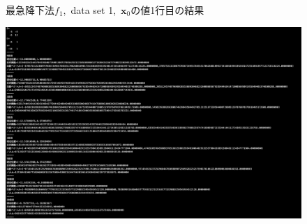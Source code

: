 \documentclass[12pt]{jarticle}
\begin{document}
\begin{figure}[h]
\begin{center}
    \end{center}
    \caption{最急降下法$f_1$,\ data set 1,\ $\boldsymbol{x}_0$の値1行目の結果}
\end{figure}

\clearpage
\begin{figure}[h]
    \begin{center}
        \includegraphics[scale=0.2]{kadai1_1s_out1_2_1.png}
    \end{center}
    \begin{minipage}{0.5\hsize}
        \begin{center}

\end{center}
\end{minipage}
\end{figure}
\end{document}
